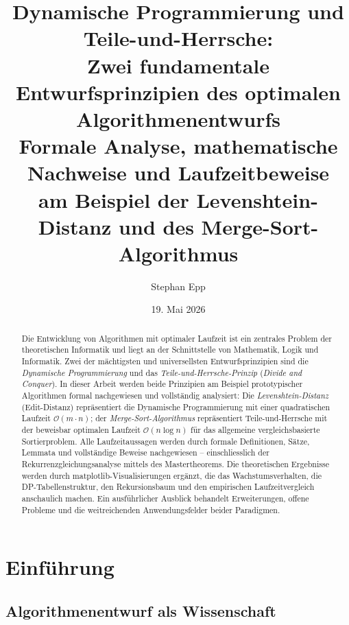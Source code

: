 ﻿\documentclass[a4paper,12pt]{article}
\title{\textbf{Dynamische Programmierung und Teile-und-Herrsche:}\\
\textbf{Zwei fundamentale Entwurfsprinzipien des optimalen Algorithmenentwurfs}\\
\large Formale Analyse, mathematische Nachweise und Laufzeitbeweise\\
am Beispiel der Levenshtein-Distanz und des Merge-Sort-Algorithmus}
\author{Stephan Epp}
\date{19. Mai 2026}
\theoremstyle{definition}
\begin{document}
\maketitle

\begin{abstract}
\noindent
Die Entwicklung von Algorithmen mit optimaler Laufzeit ist ein zentrales Problem der
theoretischen Informatik und liegt an der Schnittstelle von Mathematik, Logik und
Informatik. Zwei der mächtigsten und universellsten Entwurfsprinzipien sind die
\emph{Dynamische Programmierung} und das \emph{Teile-und-Herrsche-Prinzip}
(\textit{Divide and Conquer}).
In dieser Arbeit werden beide Prinzipien am Beispiel prototypischer Algorithmen formal
nachgewiesen und vollständig analysiert: Die \emph{Levenshtein-Distanz} (Edit-Distanz)
repräsentiert die Dynamische Programmierung mit einer quadratischen Laufzeit
$\mathcal{O}(m \cdot n)$; der \emph{Merge-Sort-Algorithmus} repräsentiert
Teile-und-Herrsche mit der beweisbar optimalen Laufzeit $\mathcal{O}(n \log n)$
für das allgemeine vergleichsbasierte Sortierproblem.
Alle Laufzeitaussagen werden durch formale Definitionen, Sätze, Lemmata und vollständige
Beweise nachgewiesen -- einschliesslich der Rekurrenzgleichungsanalyse mittels
des Mastertheorems. Die theoretischen Ergebnisse werden durch matplotlib-Visualisierungen
ergänzt, die das Wachstumsverhalten, die DP-Tabellenstruktur, den Rekursionsbaum
und den empirischen Laufzeitvergleich anschaulich machen.
Ein ausführlicher Ausblick behandelt Erweiterungen, offene Probleme und
die weitreichenden Anwendungsfelder beider Paradigmen.
\end{abstract}

\tableofcontents
\newpage

\section{Einführung}

\subsection{Algorithmenentwurf als Wissenschaft}
\end{document}
